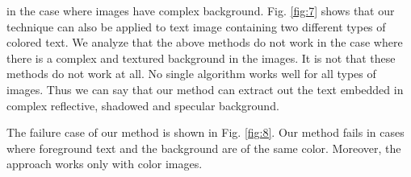 in the case where images have
complex background. Fig. \ref{fig:7} shows that our technique can also be applied to text image containing 
two different types of colored text.
We analyze that the above methods do not work in the case where there is a complex and textured background in the images.
It is not that these methods do not work at all. No single algorithm works well for all types of images. Thus we can say
that our method can extract out the text embedded in complex reflective, shadowed and
specular background.


The failure case of our method is shown in Fig. \ref{fig:8}.
Our method fails in cases where foreground text and the background are of the same color.
Moreover, the approach works only with color images.



% 
% 
% 

